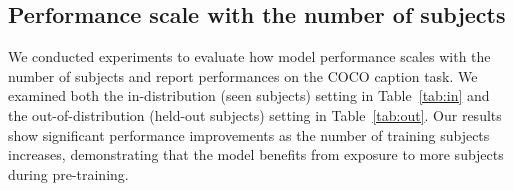 
\subsection{Performance scale with the number of subjects}

We conducted experiments to evaluate how model performance scales with the number of subjects and report performances on the COCO caption task. We examined both the in-distribution (seen subjects) setting in Table~\ref{tab:in} and the out-of-distribution (held-out subjects) setting in Table~\ref{tab:out}. Our results show significant performance improvements as the number of training subjects increases, demonstrating that the model benefits from exposure to more subjects during pre-training.

\begingroup
{}
\begin{table}[!htp]\centering
\caption{Performance scaling with number of subjects (in-distribution). Evaluation is performed on Subject 1, who is included during training.}\label{tab:in}
\vskip 0.1in
\end{table}


